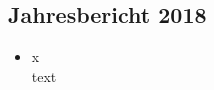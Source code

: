 \subsection{Jahresbericht 2018}
\begin{history}


    \begin{itemize}

        \item[]x\\
        text

    \end{itemize}

\end{history}
